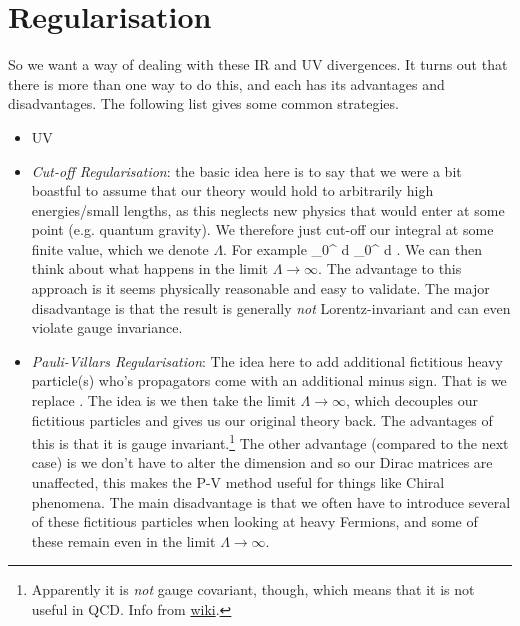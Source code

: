 \section{Regularisation}

So we want a way of dealing with these IR and UV divergences. It turns out that there is more than one way to do this, and each has its advantages and disadvantages. The following list gives some common strategies. 
\begin{itemize}
    \item UV 
        \ben[label=(\roman*)] 
            \item \textit{Cut-off Regularisation}: the basic idea here is to say that we were a bit boastful to assume that our theory would hold to arbitrarily high energies/small lengths, as this neglects new physics that would enter at some point (e.g. quantum gravity). We therefore just cut-off our integral at some finite value, which we denote $\Lambda$. For example
            \bse 
                \int_0^{\infty} d\ell {} \to \int_0^{\Lambda} d\ell {} \propto \log \Lambda.
            \ese 
            We can then think about what happens in the limit $\Lambda\to\infty$. The advantage to this approach is it seems physically reasonable and easy to validate. The major disadvantage is that the result is generally \textit{not} Lorentz-invariant and can even violate gauge invariance. 
            \item \textit{Pauli-Villars Regularisation}: The idea here to add additional fictitious heavy particle(s) who's propagators come with an additional minus sign. That is we replace 
            \bse 
                \int {} \to \int {} \propto \log{}.
            \ese 
            The idea is we then take the limit $\Lambda\to\infty$, which decouples our fictitious particles and gives us our original theory back. The advantages of this is that it is gauge invariant.\footnote{Apparently it is \textit{not} gauge covariant, though, which means that it is not useful in QCD. Info from \href{https://en.wikipedia.org/wiki/Pauli–Villars_regularization}{wiki}.} The other advantage (compared to the next case) is we don't have to alter the dimension and so our Dirac matrices are unaffected, this makes the P-V method useful for things like Chiral phenomena. The main disadvantage is that we often have to introduce several of these fictitious particles when looking at heavy Fermions, and some of these remain even in the limit $\Lambda\to\infty$.

\end{itemize}
